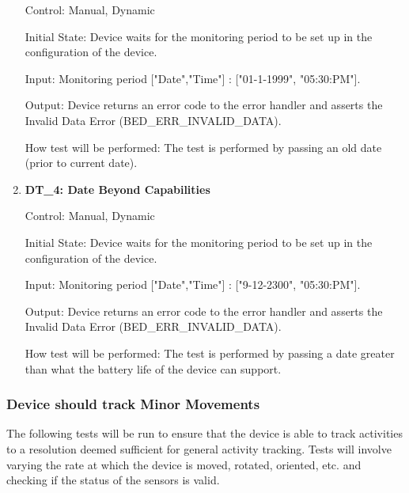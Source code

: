 \documentclass[12pt, titlepage]{article}
\begin{document}
\begin{enumerate}
		Control: Manual, Dynamic
							
		Initial State: Device waits for the monitoring period to be set up in the configuration of the device.
							
		Input: Monitoring period ["Date","Time"] : ["01-1-1999", "05:30:PM"].
							
		Output: Device returns an error code to the error handler and asserts the Invalid Data Error (BED\_ERR\_INVALID\_DATA).
		
		How test will be performed: The test is performed by passing an old date (prior to current date).

	\item{\textbf{DT\_4: Date Beyond Capabilities}\\}\label{DT4}
		
		Control: Manual, Dynamic
							
		Initial State: Device waits for the monitoring period to be set up in the configuration of the device.
							
		Input: Monitoring period ["Date","Time"] : ["9-12-2300", "05:30:PM"].
							
		Output: Device returns an error code to the error handler and asserts the Invalid Data Error (BED\_ERR\_INVALID\_DATA).

		How test will be performed: The test is performed by passing a date greater than what the battery life of the device can support.

\end{enumerate}

\subsubsection{Device should track Minor Movements}
The following tests will be run to ensure that the device is able to track activities to a resolution deemed sufficient for general activity tracking. Tests will involve varying the rate at which the device is moved, rotated, oriented, etc. and checking if the status of the sensors is valid.
\end{document}
